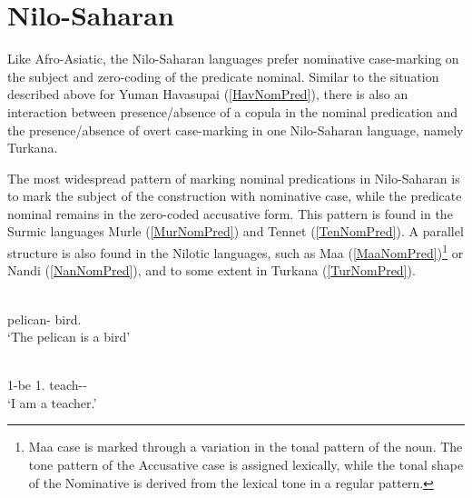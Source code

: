 
\section{Nilo-Saharan}\label{NomPredNilo}

Like Afro-Asiatic, the Nilo-Saharan languages prefer nominative case-marking on the subject and zero-coding of the predicate nominal. 
Similar to the situation described above for Yuman Havasupai (\ref{HavNomPred}), there is also an interaction between presence/absence of a copula in the nominal predication and the presence/absence of overt case-marking in one Nilo-Saharan language, namely Turkana.  

The most widespread pattern of marking nominal predications in Nilo-Saharan is to mark the subject of the construction with nominative case, while the predicate nominal remains in the zero-coded accusative form. 
This pattern is found in the Surmic languages Murle (\ref{MurNomPred}) and Tennet (\ref{TenNomPred}). 
A parallel structure is also found in the Nilotic languages, such as Maa (\ref{MaaNomPred})\footnote{Maa case is marked through a variation in the tonal pattern of the noun. 
The tone pattern of the Accusative case is assigned lexically, while the tonal shape of the
Nominative is derived from the lexical tone in a regular pattern.} 
or  Nandi (\ref{NanNomPred}), and to some extent in Turkana (\ref{TurNomPred}). 

\begin{exe}\ex\label{MurNomPred}
 \gll {} \\
pelican-\nom{} bird.\pl{}\\
\glt `The pelican is a bird' \end{exe}


\begin{exe}\ex\label{TenNomPred}
\gll{}  \\
1-be 1\sg{}.\nom{} teach-\agnm{}-\sg{}\\
\glt `I am a teacher.' \end{exe}



